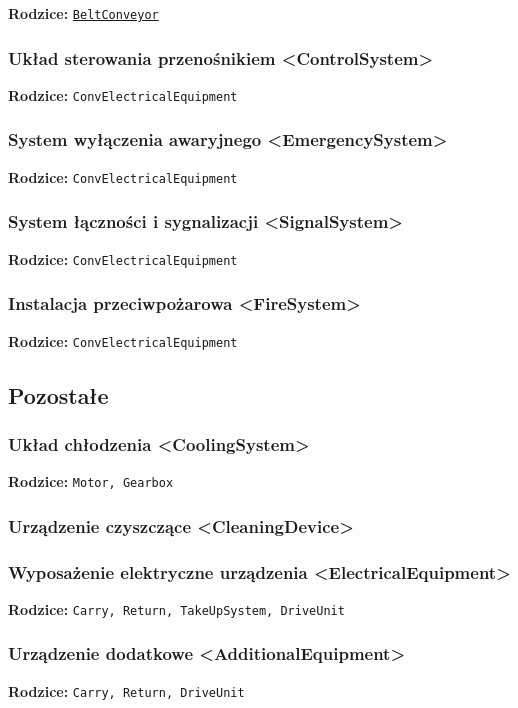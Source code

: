 \documentclass[12pt,a4paper]{article}
\begin{document}
\noindent\textbf{Rodzice:} \texttt{\hyperref[sec:BeltConveyor]{BeltConveyor}}


\subsubsection{Układ sterowania przenośnikiem <ControlSystem>}
\noindent\textbf{Rodzice:} \texttt{ConvElectricalEquipment}

\subsubsection{System wyłączenia awaryjnego <EmergencySystem>}
\noindent\textbf{Rodzice:} \texttt{ConvElectricalEquipment}

\subsubsection{System łączności i sygnalizacji <SignalSystem>}
\noindent\textbf{Rodzice:} \texttt{ConvElectricalEquipment}

\subsubsection{Instalacja przeciwpożarowa <FireSystem>}
\noindent\textbf{Rodzice:} \texttt{ConvElectricalEquipment}

\subsection{Pozostałe}

\subsubsection{Układ chłodzenia <CoolingSystem>}
\noindent\textbf{Rodzice:} \texttt{Motor, Gearbox}

\subsubsection{Urządzenie czyszczące <CleaningDevice>}


\subsubsection{Wyposażenie elektryczne urządzenia <ElectricalEquipment>}
\noindent\textbf{Rodzice:} \texttt{Carry, Return, TakeUpSystem, DriveUnit}


\subsubsection{Urządzenie dodatkowe <AdditionalEquipment>}
\noindent\textbf{Rodzice:} \texttt{Carry, Return, DriveUnit}
\end{document}
